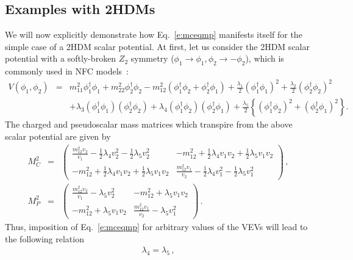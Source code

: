 \documentclass[11pt]{article}
\begin{document}
\subsection{Examples with 2HDMs}
%
We will now explicitly demonstrate how Eq.~\eqref{e:mceqmp} manifests itself for the simple case of a 2HDM scalar potential.  
At first, let us consider the 2HDM scalar potential with a softly-broken $Z_2$ symmetry ($\phi_1\to\phi_1, \phi_2\to-\phi_2$), which is commonly used in NFC models~\cite{Branco:2011iw}:
%
\begin{eqnarray}
	\label{e:2scapot}
	V(\phi_1, \phi_2) &=& m_{11}^2 \phi_1^\dagger \phi_1 + m_{22}^2\phi_2^\dagger \phi_2 - m_{12}^2( \phi_1^\dagger \phi_2 + \phi_2^\dagger \phi_1) + \frac{\lambda_1}{2}(\phi_1^\dagger \phi_1)^2 + \frac{\lambda_2}{2}(\phi_2^\dagger \phi_2)^2 \nonumber \\
	&& + \lambda_3 (\phi_1^\dagger \phi_1)(\phi_2^\dagger \phi_2) + \lambda_4(\phi_1^\dagger \phi_2)(\phi_2^\dagger \phi_1) + \frac{\lambda_5}{2} \left\{  (\phi_1^\dagger \phi_2)^2  + (\phi_2^\dagger \phi_1)^2  \right\} .
\end{eqnarray}
%
The charged and pseudoscalar mass matrices which transpire from the above scalar potential are given by
%
\begin{subequations}
\begin{eqnarray}
	\label{e:2mcsq}
	M_C^2 &=& \begin{pmatrix}
	\frac{m_{12}^2 v_2}{v_1} -\frac{1}{2}\lambda_4 v_2^2  -\frac{1}{2}\lambda_5 v_2^2 & -m_{12}^2 + \frac{1}{2} \lambda_4 v_1 v_2 + \frac{1}{2} \lambda_5 v_1 v_2 \\
	-m_{12}^2 + \frac{1}{2}\lambda_4 v_1 v_2 + \frac{1}{2}\lambda_5 v_1 v_2 & \frac{m_{12}^2 v_1}{v_2} -\frac{1}{2} \lambda_4 v_1^2 -\frac{1}{2} \lambda_5 v_1^2
	\end{pmatrix}\,, \\
	\label{e:2mpsq}
	M_P^2 &=& \begin{pmatrix}
	\frac{m_{12}^2 v_2}{v_1} - \lambda_5 v_2^2 & - m_{12}^2+ \lambda_5 v_1v_2  \\
	- m_{12}^2+ \lambda_5 v_1v_2 & \frac{m_{12}^2 v_1}{v_2} -\lambda_5 v_1^2
	\end{pmatrix}\,.
\end{eqnarray}
%
\end{subequations}
Thus, imposition of Eq.~\eqref{e:mceqmp} for arbitrary values of the VEVs will lead to the following relation
%
\begin{eqnarray}
	\label{e:z2_conditions}
	\lambda_4=\lambda_5\, ,
\end{eqnarray}
\end{document}
